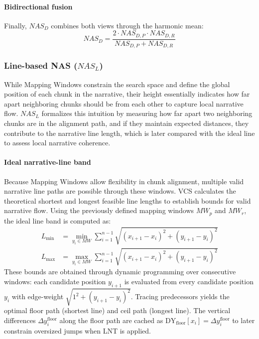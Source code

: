 \documentclass[main.tex]{subfiles}
\begin{document}
\paragraph{Bidirectional fusion}
Finally, $NAS_D$ combines both views through the harmonic mean:
\begin{equation}
NAS_D = \frac{2 \cdot NAS_{D,P} \cdot NAS_{D,R}}{NAS_{D,P} + NAS_{D,R}}
\end{equation}

\subsubsection{Line-based NAS ($NAS_L$)}
While Mapping Windows constrain the search space and define the global position of each chunk in the narrative, their height essentially indicates how far apart neighboring chunks should be from each other to capture local narrative flow. $NAS_L$ formalizes this intuition by measuring how far apart two neighboring chunks are in the alignment path, and if they maintain expected distances, they contribute to the narrative line length, which is later compared with the ideal line to assess local narrative coherence.

\paragraph{Ideal narrative-line band}
Because Mapping Windows allow flexibility in chunk alignment, multiple valid narrative line paths are possible through these windows. VCS calculates the theoretical shortest and longest feasible line lengths to establish bounds for valid narrative flow. Using the previously defined mapping windows $MW_p$ and $MW_r$, the ideal line band is computed as:
\begin{align}
L_{\min} &= \min_{y_i \in MW} \sum_{i=1}^{n-1} \sqrt{(x_{i+1} - x_i)^2 + (y_{i+1} - y_i)^2} \\
L_{\max} &= \max_{y_i \in MW} \sum_{i=1}^{n-1} \sqrt{(x_{i+1} - x_i)^2 + (y_{i+1} - y_i)^2}
\end{align}
These bounds are obtained through dynamic programming over consecutive windows: each candidate position $y_{i+1}$ is evaluated from every candidate position $y_i$ with edge-weight $\sqrt{1^2 + (y_{i+1} - y_i)^2}$. Tracing predecessors yields the optimal floor path (shortest line) and ceil path (longest line). The vertical differences $\Delta y_i^{\text{floor}}$ along the floor path are cached as $\text{DY}_{\text{floor}}[x_i] = \Delta y_i^{\text{floor}}$ to later constrain oversized jumps when LNT is applied.
\end{document}
